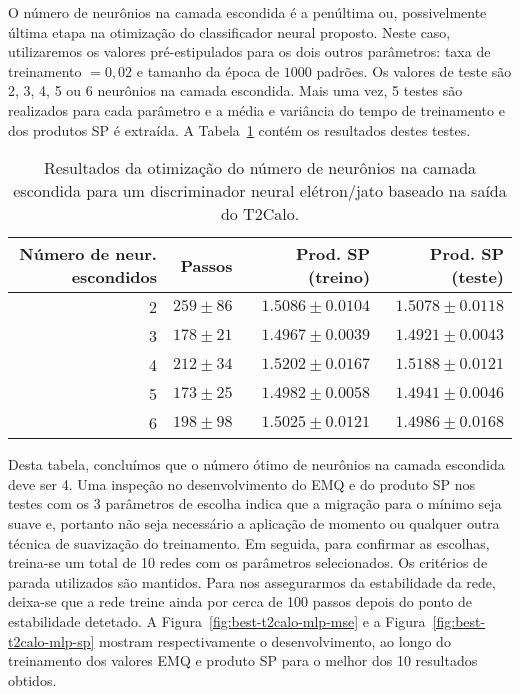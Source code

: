 O número de neurônios na camada escondida é a penúltima ou, possivelmente
última etapa na otimização do classificador neural proposto. Neste caso,
utilizaremos os valores pré-estipulados para os dois outros parâmetros: taxa
de treinamento $=0,02$ e tamanho da época de $1000$ padrões. Os valores de
teste são 2, 3, 4, 5 ou 6 neurônios na camada escondida. Mais uma vez, 5
testes são realizados para cada parâmetro e a média e variância do tempo de
treinamento e dos produtos SP é extraída. A
Tabela~\ref{tab:t2calo-neural-hidden-scan} contém os resultados destes testes.

\begin{table}
\begin{center}
\begin{tabular}{|r|r|r|r|} \hline
Número de neur. escondidos & Passos & Prod. SP (treino) &
Prod. SP (teste) \\ \hline 
2 & $259\pm86$ & $1.5086\pm0.0104$ & $1.5078\pm0.0118$ \\ \hline
3 & $178\pm21$ & $1.4967\pm0.0039$ & $1.4921\pm0.0043$ \\ \hline
4 & $212\pm34$ & $1.5202\pm0.0167$ & $1.5188\pm0.0121$ \\ \hline
5 & $173\pm25$ & $1.4982\pm0.0058$ & $1.4941\pm0.0046$ \\ \hline
6 & $198\pm98$ & $1.5025\pm0.0121$ & $1.4986\pm0.0168$ \\ \hline
\end{tabular}
\end{center}
\caption{Resultados da otimização do número de neurônios na camada escondida
para um discriminador neural elétron/jato baseado na saída do T2Calo.}
\label{tab:t2calo-neural-hidden-scan}
\end{table}

Desta tabela, concluímos que o número ótimo de neurônios na camada escondida
deve ser 4. Uma inspeção no desenvolvimento do EMQ e do produto SP nos testes
com os 3 parâmetros de escolha indica que a migração para o mínimo seja suave
e, portanto não seja necessário a aplicação de momento ou qualquer outra
técnica de suavização do treinamento. Em seguida, para confirmar as escolhas,
treina-se um total de 10 redes com os parâmetros selecionados. Os critérios de
parada utilizados são mantidos. Para nos assegurarmos da estabilidade da rede,
deixa-se que a rede treine ainda por cerca de 100 passos depois do ponto de
estabilidade detetado. A Figura~\ref{fig:best-t2calo-mlp-mse} e a
Figura~\ref{fig:best-t2calo-mlp-sp} mostram respectivamente o desenvolvimento,
ao longo do treinamento dos valores EMQ e produto SP para o melhor dos 10
resultados obtidos.

